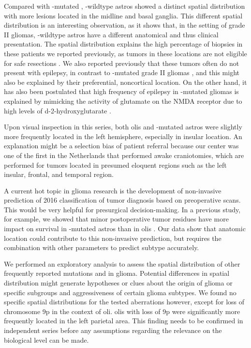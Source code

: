 Compared with -mutated , -wildtype \glspl{astro} showed a distinct spatial distribution with more lesions located in the midline and basal ganglia.
This different spatial distribution is an interesting observation, as it shows that, in the setting of grade II gliomas, -wildtype \glspl{astro} have a different anatomical and thus clinical presentation.
The spatial distribution explains the high percentage of biopsies in these patients we reported previously, as \glspl{tumor} in these locations are not eligible for safe resections \autocite{wijnenga2017impact}.
We also reported previously that these \glspl{tumor} often do not present with epilepsy, in contrast to -mutated grade II gliomas \autocite{wijnenga2017impact}, and this might also be explained by their preferential, noncortical location.
On the other hand, it has also been postulated that high frequency of epilepsy in -mutated gliomas is explained by mimicking the activity of glutamate on the NMDA receptor due to high levels of d-2-hydroxyglutarate \autocite{chen2017mutant}.

Upon visual inspection in this series, both \glspl{oli} and -mutated \glspl{astro} were slightly more frequently located in the left hemisphere, especially in insular location.
An explanation might be a selection bias of patient referral because our center was one of the first in the Netherlands that performed awake craniotomies, which are performed for \glspl{tumor} located in presumed eloquent regions such as the left insular, frontal, and temporal region.

A current hot topic in glioma research is the development of non-invasive prediction of  2016 classification of \gls{tumor} diagnosis based on preoperative  scans.
This would be very helpful for presurgical decision-making.
In a previous study, for example, we showed that minor postoperative \gls{tumor} residues have more impact on survival in -mutated \glspl{astro} than in \glspl{oli} \autocite{wijnenga2017impact}.
Our data show that anatomic location could contribute to this non-invasive prediction, but requires the combination with other parameters to predict  subtype accurately.

We performed an exploratory analysis to assess the spatial distribution of other frequently reported mutations and  in glioma.
Potential differences in spatial distribution might generate hypotheses or clues about the origin of glioma or specific subgroups and aggressiveness of certain glioma subtypes.
We found no specific spatial distributions for the tested aberrations however, except for loss of chromosome 9p in the context of \gls{oli}.
\Glspl{oli} with loss of 9p were significantly more frequently located in the left parietal area.
This finding needs to be confirmed in independent series before any assumptions regarding the relevance on the biological level can be made.

